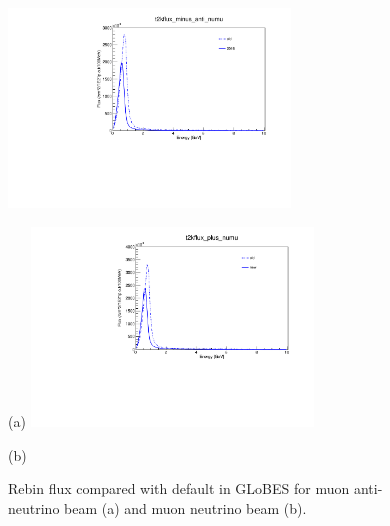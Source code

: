 \documentclass[a4 paper,12pt]{report}%
\begin{document}
  \begin{figure}
 	\centering
 	\includegraphics[width=7.5cm]{t2kflux_minus_anti_numu.pdf} 
 	\caption*{}{(a)}
 \endminipage
 \hfill
\quad
 \centering
 \includegraphics[width=7.5cm]{t2kflux_plus_numu.pdf}
 \caption*{}{(b)}
 \endminipage
  \caption{{\label{rebinflux}} Rebin flux compared with default in GLoBES for muon anti-neutrino beam (a) and muon neutrino beam (b).}
 \hfill
 \end{figure}
\end{document}
